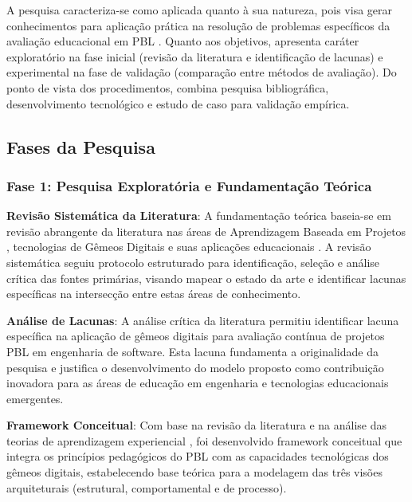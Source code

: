 \documentclass[12pt, a4paper, oneside, brazilian]{abntex2}
\begin{document}
A pesquisa caracteriza-se como aplicada quanto à sua natureza, pois visa gerar conhecimentos para aplicação prática na resolução de problemas específicos da avaliação educacional em PBL \cite{gil91}. Quanto aos objetivos, apresenta caráter exploratório na fase inicial (revisão da literatura e identificação de lacunas) e experimental na fase de validação (comparação entre métodos de avaliação). Do ponto de vista dos procedimentos, combina pesquisa bibliográfica, desenvolvimento tecnológico e estudo de caso para validação empírica.

\subsection{Fases da Pesquisa}

\subsubsection{Fase 1: Pesquisa Exploratória e Fundamentação Teórica}

\textbf{Revisão Sistemática da Literatura}: A fundamentação teórica baseia-se em revisão abrangente da literatura nas áreas de Aprendizagem Baseada em Projetos \cite{thomas2000, savery2015, hmelo2004}, tecnologias de Gêmeos Digitais \cite{grieves2014, tao2018, barricelli2019} e suas aplicações educacionais \cite{bachmann2023, silveira2024panorama}. A revisão sistemática seguiu protocolo estruturado para identificação, seleção e análise crítica das fontes primárias, visando mapear o estado da arte e identificar lacunas específicas na intersecção entre estas áreas de conhecimento.

\textbf{Análise de Lacunas}: A análise crítica da literatura permitiu identificar lacuna específica na aplicação de gêmeos digitais para avaliação contínua de projetos PBL em engenharia de software. Esta lacuna fundamenta a originalidade da pesquisa e justifica o desenvolvimento do modelo proposto como contribuição inovadora para as áreas de educação em engenharia e tecnologias educacionais emergentes.

\textbf{Framework Conceitual}: Com base na revisão da literatura e na análise das teorias de aprendizagem experiencial \cite{kolb1984}, foi desenvolvido framework conceitual que integra os princípios pedagógicos do PBL \cite{duch2001} com as capacidades tecnológicas dos gêmeos digitais, estabelecendo base teórica para a modelagem das três visões arquiteturais (estrutural, comportamental e de processo).
\end{document}
